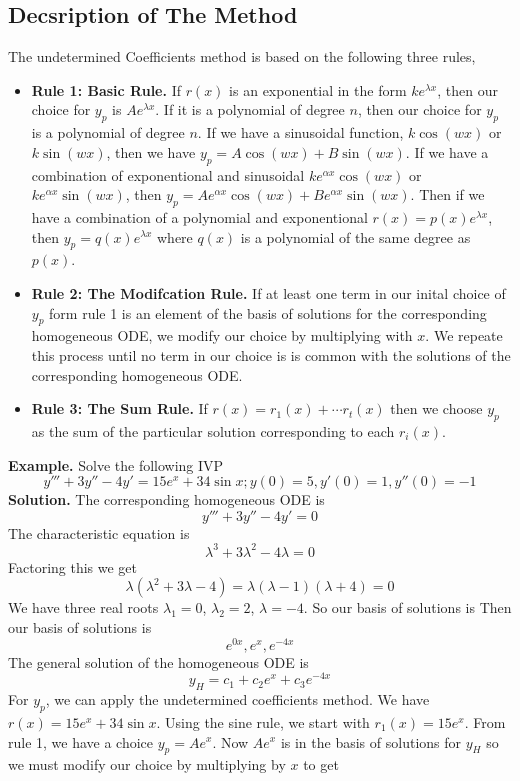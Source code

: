 \documentclass[openany]{report}
\begin{document}
\subsection{Decsription of The Method}
The undetermined Coefficients method is based on the following three rules, 
\begin{itemize}
    \item \textbf{Rule 1: Basic Rule.} If $r(x)$ is an exponential in the form $ke^{\lambda x}$, then our choice for $y_p$ is $Ae^{\lambda x}$. If it is a polynomial of degree $n$, then our choice for $y_p$ is a polynomial of degree $n$. If we have a sinusoidal function, $k\cos(wx)$ or $k\sin(wx)$, then we have $y_p = A\cos(wx) + B\sin(wx)$. If we have a combination of exponentional and sinusoidal $ke^{\alpha x}\cos(wx)$ or $ke^{\alpha x}\sin(wx)$, then $y_p = Ae^{\alpha x}\cos(wx) + Be^{\alpha x}\sin(wx)$. Then if we have a combination of a polynomial and exponentional $r(x) = p(x)e^{\lambda x}$, then $y_p = q(x)e^{\lambda x}$ where $q(x)$ is a polynomial of the same degree as $p(x)$.
    \item \textbf{Rule 2: The Modifcation Rule.} If at least one term in our inital choice of $y_p$ form rule 1 is an element of the basis of solutions for the corresponding homogeneous ODE, we modify our choice by multiplying with $x$. We repeate this process until no term in our choice is is common with the solutions of the corresponding homogeneous ODE. 
    \item \textbf{Rule 3: The Sum Rule.} If $r(x) = r_1(x) + \cdots r_t(x)$ then we choose $y_p$ as the sum of the particular solution corresponding to each $r_i(x)$.
\end{itemize}
\textbf{Example.} Solve the following IVP 
\[y''' + 3y'' - 4y' = 15e^x + 34\sin x; y(0) = 5, y'(0) = 1, y''(0) = -1\]
\textbf{Solution.} The corresponding homogeneous ODE is 
\[y''' + 3y'' - 4y' = 0\]
The characteristic equation is 
\[\lambda^3 + 3\lambda^2 - 4 \lambda = 0\]
Factoring this we get 
\[\lambda(\lambda^2 + 3\lambda - 4) = \lambda(\lambda-1)(\lambda+4) = 0\]
We have three real roots $\lambda_1 = 0$, $\lambda_2 = 2$, $\lambda = -4$. So our basis of solutions is 
Then our basis of solutions is 
\[{e^{0x}, e^x, e^{-4x}}\]
The general solution of the homogeneous ODE is 
\[y_H = c_1 + c_2e^x + c_3e^{-4x}\]
For $y_p$, we can apply the undetermined coefficients method. We have $r(x) = 15e^x + 34\sin x$. Using the sine rule, we start with $r_1(x) = 15e^x$. From rule 1, we have a choice $y_p = Ae^x$. Now $Ae^x$ is in the basis of solutions for $y_H$ so we must modify our choice by multiplying by $x$ to get 
\end{document}
